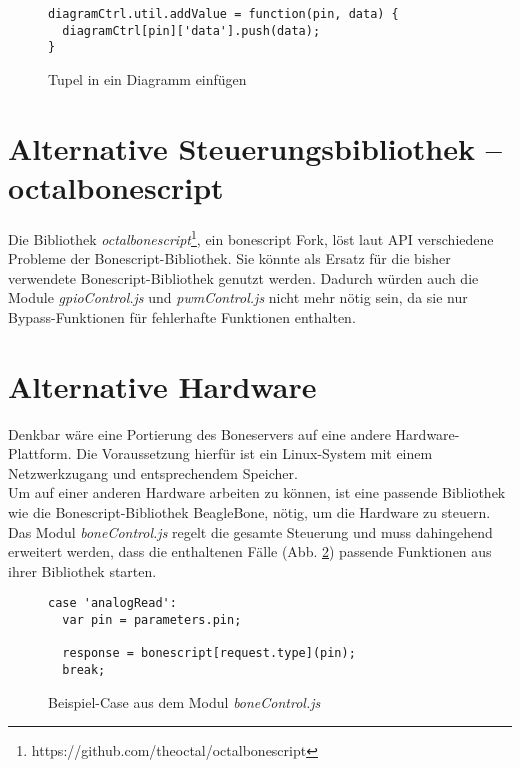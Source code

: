 \begin{figure}[H]
\begin{lstlisting}
diagramCtrl.util.addValue = function(pin, data) {
  diagramCtrl[pin]['data'].push(data);
}
\end{lstlisting}
\caption{Tupel in ein Diagramm einfügen}
\label{lst:insertTupel}
\end{figure}


\section{Alternative Steuerungsbibliothek -- octalbonescript}
Die Bibliothek \textit{octalbonescript}\footnote{https://github.com/theoctal/octalbonescript}, ein bonescript Fork, löst laut API verschiedene Probleme der Bonescript-Bibliothek. Sie könnte als Ersatz für die bisher verwendete Bonescript-Bibliothek genutzt werden. Dadurch würden auch die Module \textit{gpioControl.js} und \textit{pwmControl.js} nicht mehr nötig sein, da sie nur Bypass-Funktionen für fehlerhafte Funktionen enthalten.


\section{Alternative Hardware}
Denkbar wäre eine Portierung des Boneservers auf eine andere Hardware-Plattform. Die Voraussetzung hierfür ist ein Linux-System mit einem Netzwerkzugang und entsprechendem Speicher.\\

Um auf einer anderen Hardware arbeiten zu können, ist eine passende Bibliothek wie die Bonescript-Bibliothek BeagleBone, nötig, um die Hardware zu steuern. Das Modul \textit{boneControl.js} regelt die gesamte Steuerung und muss dahingehend erweitert werden, dass die enthaltenen Fälle (Abb. \ref{lst:exampleCase}) passende Funktionen aus ihrer Bibliothek starten.

\begin{figure}[H]
\begin{lstlisting}
case 'analogRead':
  var pin = parameters.pin;

  response = bonescript[request.type](pin);
  break;
\end{lstlisting}
\caption{Beispiel-Case aus dem Modul \textit{boneControl.js}}
\label{lst:exampleCase}
\end{figure}


